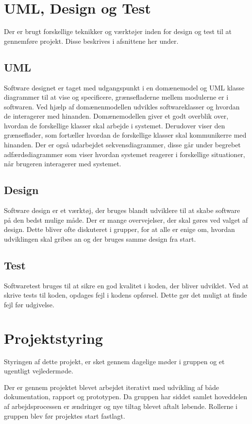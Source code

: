 \section{UML, Design og Test}
Der er brugt forskellige teknikker og værktøjer inden for design og test til at gennemføre projekt. Disse beskrives i afsnittene her under.
\subsection{UML}
Software designet er taget med udgangspunkt i en domænemodel og UML\cite{UML} klasse diagrammer til at vise og specificere, grænsefladerne mellem modulerne er i softwaren.
Ved hjælp af domænenmodellen udvikles softwareklasser og hvordan de interagerer med hinanden.
Domænemodellen giver et godt overblik over, hvordan de forskellige klasser skal arbejde i systemet. Derudover viser den grænseflader, som fortæller hvordan de forskellige klasser skal kommunikerre med hinanden.
Der er også udarbejdet sekvensdiagrammer, disse går under begrebet adfærdsdiagrammer som viser hvordan systemet reagerer i forskellige situationer, når brugeren interagerer med systemet.

\subsection{Design}
Software design er et værktøj, der bruges blandt udviklere til at skabe software på den bedst mulige måde. Der er mange overvejelser, der skal gøres ved valget af design. Dette bliver ofte diskuteret i grupper, for at alle er enige om, hvordan udviklingen skal gribes an og der bruges samme design fra start.

\subsection{Test}
Softwaretest bruges til at sikre en god kvalitet i koden, der bliver udviklet. Ved at skrive tests til koden, opdages fejl i kodens opførsel. Dette gør det muligt at finde fejl før udgivelse.
\newline

\section{Projektstyring}
Styringen af dette projekt, er sket gennem dagelige møder i gruppen og et ugentligt vejledermøde.
 
Der er gennem projektet blevet arbejdet iterativt med udvikling af både dokumentation, rapport og prototypen. Da gruppen har siddet samlet hoveddelen af arbejdsprocessen er ændringer og nye tiltag blevet aftalt løbende.
Rollerne i gruppen blev før projektes start fastlagt.

